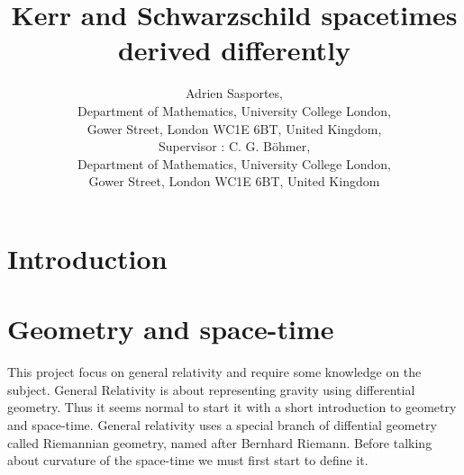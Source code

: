 \documentclass[a4paper,12pt]{article}
\title{Kerr and Schwarzschild spacetimes derived differently}
\author{Adrien Sasportes,\\
Department of Mathematics, University College London, \\
Gower Street, London WC1E 6BT, United Kingdom,
\\ Supervisor : C. G. B\"ohmer,\\
Department of Mathematics, University College London, \\
Gower Street, London WC1E 6BT, United Kingdom
}
\theoremstyle{definition}
\begin{document}
\maketitle
{}
\newtheorem{definition}{Definition}

\section{Introduction}

\section{Geometry and space-time}
This project focus on general relativity and require some knowledge on the subject.
General Relativity is about representing gravity using differential geometry.
Thus it seems normal to start it with a short introduction to geometry and space-time.
General relativity uses a special branch of diffential geometry called Riemannian geometry, named after Bernhard Riemann.
Before talking about curvature of the space-time we must first start to define it.
\end{document}
